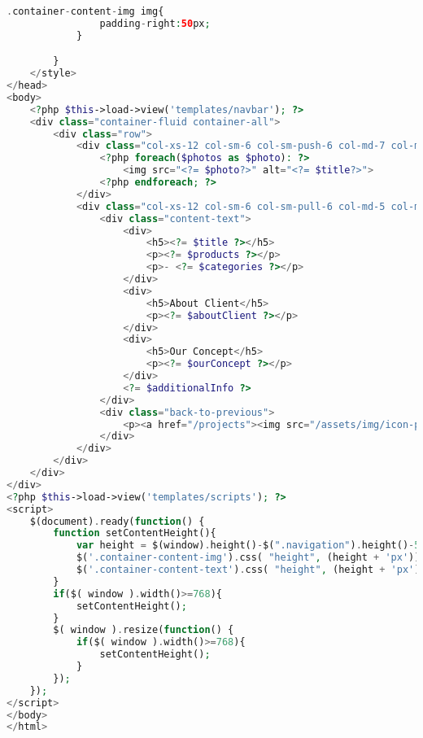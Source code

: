 \begin{lstlisting}[language=php, caption=project\_details.php]
			.container-content-img img{
				padding-right:50px;
			}

		}
	</style>
</head>
<body>
	<?php $this->load->view('templates/navbar'); ?>
	<div class="container-fluid container-all">
		<div class="row">
			<div class="col-xs-12 col-sm-6 col-sm-push-6 col-md-7 col-md-push-5 container-content-img">
				<?php foreach($photos as $photo): ?>
					<img src="<?= $photo?>" alt="<?= $title?>">
				<?php endforeach; ?>
			</div>	
			<div class="col-xs-12 col-sm-6 col-sm-pull-6 col-md-5 col-md-pull-7 container-content-text">
				<div class="content-text">
					<div>
						<h5><?= $title ?></h5>
						<p><?= $products ?></p>
						<p>- <?= $categories ?></p>
					</div>
					<div>
						<h5>About Client</h5>
						<p><?= $aboutClient ?></p>
					</div>
					<div>
						<h5>Our Concept</h5>
						<p><?= $ourConcept ?></p>
					</div>
					<?= $additionalInfo ?>
				</div>
				<div class="back-to-previous">
					<p><a href="/projects"><img src="/assets/img/icon-previous.png" alt=""> See All Projects</a></p>
				</div>
			</div>
		</div>	
	</div>
</div>
<?php $this->load->view('templates/scripts'); ?>
<script>
	$(document).ready(function() {
		function setContentHeight(){
			var height = $(window).height()-$(".navigation").height()-50;
			$('.container-content-img').css( "height", (height + 'px'));
			$('.container-content-text').css( "height", (height + 'px'));
		}
		if($( window ).width()>=768){
			setContentHeight();	
		}
		$( window ).resize(function() {
			if($( window ).width()>=768){
				setContentHeight();	
			}
		});	
	});
</script>
</body>
</html>
\end{lstlisting}






